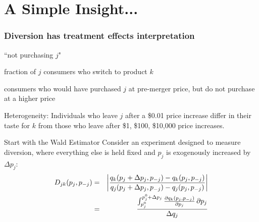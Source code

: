 \documentclass[xcolor=pdftex,dvipsnames,table,mathserif]{beamer}
\begin{document}
\section*{A Simple Insight...}

\begin{frame}
\frametitle{Diversion has treatment effects interpretation}
\begin{description}[labelwidth=\widthof{\bfseries Treated group}]
\item[Treatment] ``not purchasing $j$"
\item[Outcome] fraction of $j$ consumers who switch to product $k$
\item[Treated group] consumers who would have purchased $j$ at pre-merger price, but do not purchase at a higher price
\end{description}

Heterogeneity: Individuals who leave $j$ after a \$0.01 price increase differ in their taste for $k$ from those who leave after \$1, \$100, \$10,000 price increases.
\end{frame}



\begin{frame}{Start with the Wald Estimator}
Consider an experiment designed to measure diversion, where everything else is held fixed and $p_j$ is exogenously increased by $\Delta p_j$:
\begin{eqnarray*}
\small
D_{jk}(p_j,p_{-j}) &=&  \left| \frac{q_{k}(p_j+\Delta p_j,p_{-j}) - q_{k}(p_j,p_{-j})}{q_{j}(p_j+\Delta p_j,p_{-j}) - q_{j}(p_j,p_{-j})}   \right|  \\
&=& 
 \frac{\int_{p_j^{0}}^{p_j^0+\Delta p_j}  \frac{\partial q_k(p_j,p_{-j})}{\partial p_j}\,\partial p_j }{\Delta q_j}
\end{eqnarray*}
\end{frame}
\end{document}
